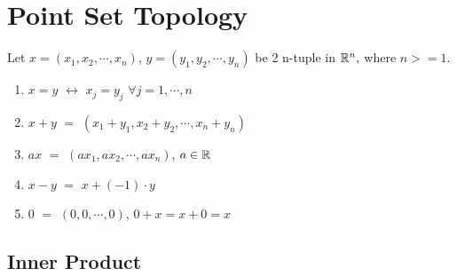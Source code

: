\documentclass {article}
\begin{document}
\section {Point Set Topology}
	Let $x=(x_1, x_2, \cdots , x_n)$, $y=(y_1, y_2, \cdots , y_n)$ be 2 n-tuple in $\Bbb R^n,$ where $n>=1$.
	\begin {enumerate}
		\item {$x=y$ $\leftrightarrow$ $x_j=y_j$ $\forall j=1,\cdots,n$}
		\item {$x+y$ $=$ $(x_1+y_1, x_2+y_2,\cdots,x_n+y_n)$}
		\item {$ax$ $=$ $(ax_1, ax_2,\cdots,ax_n)$, $a\in \Bbb R$}
		\item {$x-y$ $=$ $x+(-1)\cdot y$}
		\item {$0$ $=$ $(0,0,\cdots,0)$, $0+x=x+0=x$}
	\end {enumerate}
	
	\subsection {Inner Product}
\end{document}
